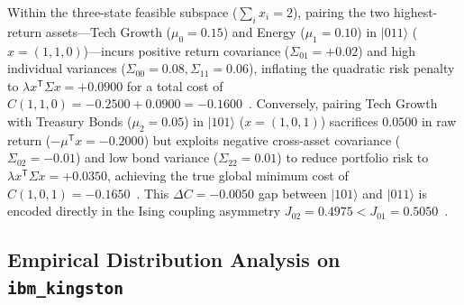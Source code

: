 \documentclass[10pt,letterpaper]{article}
\begin{document}
Within the three-state feasible subspace ($\sum_i x_i = 2$), pairing the two highest-return assets---Tech Growth ($\mu_0 = 0.15$) and Energy ($\mu_1 = 0.10$) in $\vert 011 \rangle$ ($x = (1,1,0)$)---incurs positive return covariance ($\Sigma_{01} = +0.02$) and high individual variances ($\Sigma_{00} = 0.08, \Sigma_{11} = 0.06$), inflating the quadratic risk penalty to $\lambda x^{\mathsf{T}}\Sigma x = +0.0900$ for a total cost of $C(1,1,0) = -0.2500 + 0.0900 = -0.1600$~\cite{qfx_doc}. Conversely, pairing Tech Growth with Treasury Bonds ($\mu_2 = 0.05$) in $\vert 101 \rangle$ ($x = (1,0,1)$) sacrifices $0.0500$ in raw return ($-\mu^{\mathsf{T}}x = -0.2000$) but exploits negative cross-asset covariance ($\Sigma_{02} = -0.01$) and low bond variance ($\Sigma_{22} = 0.01$) to reduce portfolio risk to $\lambda x^{\mathsf{T}}\Sigma x = +0.0350$, achieving the true global minimum cost of $C(1,0,1) = -0.1650$~\cite{qfx_doc}. This $\Delta C = -0.0050$ gap between $\vert 101 \rangle$ and $\vert 011 \rangle$ is encoded directly in the Ising coupling asymmetry $J_{02} = 0.4975 < J_{01} = 0.5050$~\cite{qfx_doc}.

\subsection{Empirical Distribution Analysis on \texttt{ibm\_kingston}}
\end{document}
